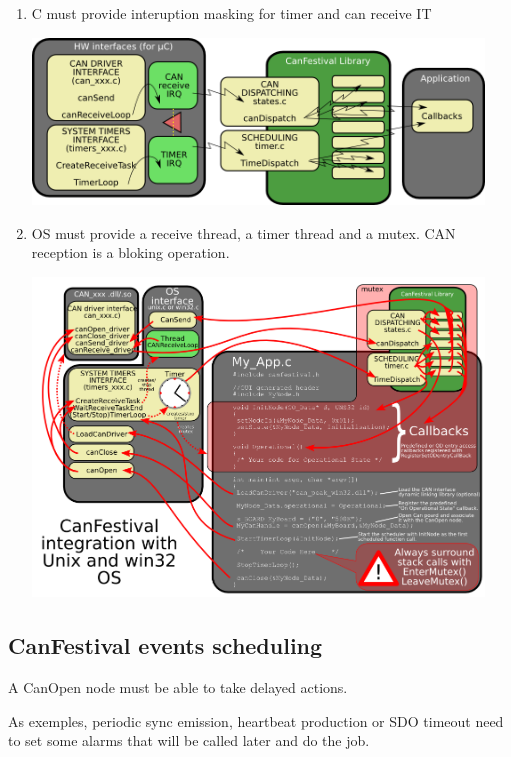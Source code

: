 \documentclass[a4paper,12pt]{book}
\newcommand\liststyleLvi{%
\renewcommand\labelitemi{{--}}
\renewcommand\labelitemii{{--}}
\renewcommand\labelitemiii{{--}}
\renewcommand\labelitemiv{{--}}
}
\begin{document}
\liststyleLvi
\begin{enumerate}
\item {\textmu}C must provide interuption masking for timer and can
receive IT\newline
 \begin{center}
   \includegraphics[width=12cm]{Pictures/10000201000003CA0000016604E6A5EF.png}
\end{center}
\item OS must provide a receive thread, a timer thread and a mutex. CAN
reception is a bloking operation.\newline
\begin{center}
   \includegraphics[width=12cm]{Pictures/10000201000003F9000002CF8B0CDAEA.png}
\end{center}
\end{enumerate}
\subsection{CanFestival events scheduling}
A CanOpen node must be able to take delayed actions.

As exemples, periodic sync emission, heartbeat production or SDO timeout
need to set some alarms that will be called later and do the job.
\end{document}
